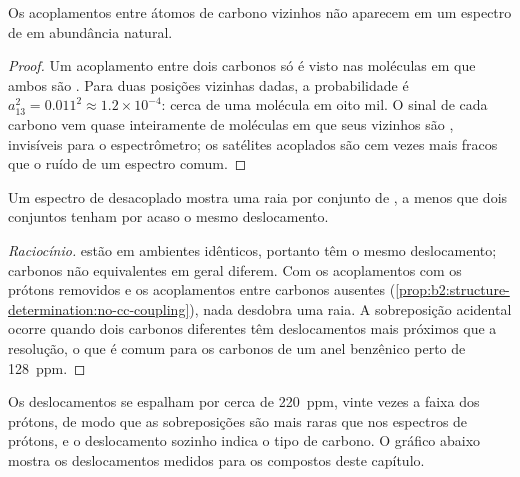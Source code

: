 \begin{proposition}\label{prop:b2:structure-determination:no-cc-coupling}
Os acoplamentos entre átomos de carbono vizinhos não aparecem em um espectro de  em
abundância natural.
\end{proposition}

\begin{proof}
Um acoplamento entre dois carbonos só é visto nas moléculas em que ambos são . Para duas
posições vizinhas dadas, a probabilidade é $a_{13}^2 = 0.011^2 \approx 1.2 \times 10^{-4}$: cerca de uma
molécula em oito mil. O sinal de cada carbono vem quase inteiramente de moléculas em que seus vizinhos são
, invisíveis para o espectrômetro; os satélites acoplados são cem vezes mais fracos que o ruído
de um espectro comum.
\end{proof}

\begin{proposition}\label{prop:b2:structure-determination:signals}
Um espectro de  desacoplado mostra uma raia por conjunto de , a menos que
dois conjuntos tenham por acaso o mesmo deslocamento.
\end{proposition}

\begin{proof}[Raciocínio]
 estão em ambientes idênticos, portanto têm o mesmo deslocamento; carbonos não
equivalentes em geral diferem. Com os acoplamentos com os prótons removidos e os acoplamentos entre
carbonos ausentes (\cref{prop:b2:structure-determination:no-cc-coupling}), nada desdobra uma raia. A
sobreposição acidental ocorre quando dois carbonos diferentes têm deslocamentos mais próximos que a
resolução, o que é comum para os carbonos de um anel benzênico perto de \qty{128}{ppm}.
\end{proof}

Os deslocamentos se espalham por cerca de \qty{220}{ppm}, vinte vezes a faixa dos prótons, de modo que
as sobreposições são mais raras que nos espectros de prótons, e o deslocamento sozinho indica o tipo de
carbono. O gráfico abaixo mostra os deslocamentos medidos para os compostos deste capítulo.

